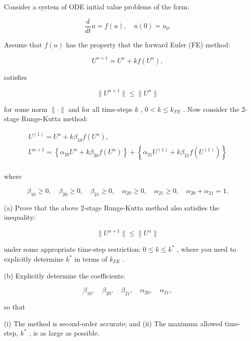 \begin{exercise}
\label{applied:2022:4}
Consider a system of ODE initial value problems of the form:

\[
\frac {d}{d t} u = f (u), \quad u (0) = u _ {0}.
\]

Assume that $f ( u )$ has the property that the forward Euler (FE) method:

\[
U ^ {n + 1} = U ^ {n} + k f (U ^ {n}),
\]

satisfies

\[
\| U ^ {n + 1} \| \leq \| U ^ {n} \|
\]

for some norm $\| \cdot \|$ and for all time-steps $k$ , $0 < k \leq k _ { F E }$ . Now consider the 2-stage Runge-Kutta method:

\[
\begin{array}{l} U ^ {(1)} = U ^ {n} + k \beta_ {1 0} f (U ^ {n}), \\ U ^ {n + 1} = \left\{\alpha_ {2 0} U ^ {n} + k \beta_ {2 0} f (U ^ {n}) \right\} + \left\{\alpha_ {2 1} U ^ {(1)} + k \beta_ {2 1} f (U ^ {(1)}) \right\} \\ \end{array}
\]

where

\[
\beta_ {1 0} \geq 0, \quad \beta_ {2 0} \geq 0, \quad \beta_ {2 1} \geq 0, \quad \alpha_ {2 0} \geq 0, \quad \alpha_ {2 1} \geq 0, \quad \alpha_ {2 0} + \alpha_ {2 1} = 1.
\]

(a) Prove that the above 2-stage Runge-Kutta method also satisfies the inequality:

\[
\| U ^ {n + 1} \| \leq \| U ^ {n} \|
\]

under some appropriate time-step restriction: $0 \leq k \leq k ^ { * }$ , where you need to explicitly determine $k ^ { * }$ in terms of $k _ { F E }$ .

(b) Explicitly determine the coefficients:

\[
\beta_ {1 0}, \quad \beta_ {2 0}, \quad \beta_ {2 1}, \quad \alpha_ {2 0}, \quad \alpha_ {2 1},
\]

so that

(i) The method is second-order accurate; and   
(ii) The maximum allowed time-step, $k ^ { * }$ , is as large as possible.
\end{exercise}

